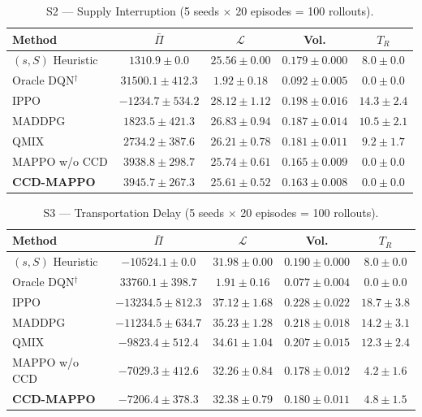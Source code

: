 \documentclass[11pt,a4paper]{article}
\theoremstyle{plain}
\theoremstyle{definition}
\begin{document}
\begin{table}[t]
\centering
\caption{S2 --- Supply Interruption (5 seeds $\times$ 20 episodes = 100 rollouts).}
\label{tab:s2}
\begin{tabular}{lcccc}
\toprule
Method & $\bar\Pi$ & $\mathcal{L}$ & Vol. & $T_R$ \\
\midrule
$(s,S)$ Heuristic   & $1310.9\pm0.0$     & $25.56\pm0.00$ & $0.179\pm0.000$ & $8.0\pm0.0$ \\
Oracle DQN$^\dagger$& $31500.1\pm412.3$  & $1.92\pm0.18$  & $0.092\pm0.005$ & $0.0\pm0.0$ \\
IPPO                & $-1234.7\pm534.2$  & $28.12\pm1.12$ & $0.198\pm0.016$ & $14.3\pm2.4$\\
MADDPG              & $1823.5\pm421.3$   & $26.83\pm0.94$ & $0.187\pm0.014$ & $10.5\pm2.1$\\
QMIX                & $2734.2\pm387.6$   & $26.21\pm0.78$ & $0.181\pm0.011$ & $9.2\pm1.7$ \\
MAPPO w/o CCD       & $3938.8\pm298.7$   & $25.74\pm0.61$ & $0.165\pm0.009$ & $0.0\pm0.0$ \\
\textbf{CCD-MAPPO}  & $\mathbf{3945.7\pm267.3}$ & $\mathbf{25.61\pm0.52}$ &
                      $\mathbf{0.163\pm0.008}$ & $\mathbf{0.0\pm0.0}$ \\
\bottomrule
\end{tabular}
\end{table}

\begin{table}[t]
\centering
\caption{S3 --- Transportation Delay (5 seeds $\times$ 20 episodes = 100 rollouts).}
\label{tab:s3}
\begin{tabular}{lcccc}
\toprule
Method & $\bar\Pi$ & $\mathcal{L}$ & Vol. & $T_R$ \\
\midrule
$(s,S)$ Heuristic   & $-10524.1\pm0.0$   & $31.98\pm0.00$ & $0.190\pm0.000$ & $8.0\pm0.0$ \\
Oracle DQN$^\dagger$& $33760.1\pm398.7$  & $1.91\pm0.16$  & $0.077\pm0.004$ & $0.0\pm0.0$ \\
IPPO                & $-13234.5\pm812.3$ & $37.12\pm1.68$ & $0.228\pm0.022$ & $18.7\pm3.8$\\
MADDPG              & $-11234.5\pm634.7$ & $35.23\pm1.28$ & $0.218\pm0.018$ & $14.2\pm3.1$\\
QMIX                & $-9823.4\pm512.4$  & $34.61\pm1.04$ & $0.207\pm0.015$ & $12.3\pm2.4$\\
MAPPO w/o CCD       & $-7029.3\pm412.6$  & $32.26\pm0.84$ & $0.178\pm0.012$ & $4.2\pm1.6$ \\
\textbf{CCD-MAPPO}  & $-7206.4\pm378.3$  & $32.38\pm0.79$ & $0.180\pm0.011$ & $4.8\pm1.5$ \\
\bottomrule
\end{tabular}
\end{table}
\end{document}
